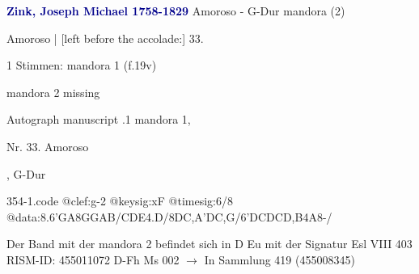 \documentclass[twocolumn]{book}
\begin{document}
\newline \par \vspace{7pt} \textcolor{darkblue}{\textbf{Zink, Joseph Michael  1758-1829}}
\newline Amoroso - G-Dur
\newline mandora (2)
\newline \begin{itshape}[f.19v, at left:] Amoroso | [left before the accolade:] 33.\end{itshape} 
\newline \textcolor{darkblue}{}  1 Stimmen: mandora 1  (f.19v)
\newline \begin{small} mandora 2 missing\end{small} 
\newline Autograph manuscript
.1  mandora 1, \begin{itshape}Nr. 33. Amoroso\end{itshape}, G-Dur  
\begin{filecontents*}{354-1.code}
@clef:g-2
@keysig:xF
@timesig:6/8
@data:{8.6'GA8G}{GAB}/{CDE}4.D/{8DC,A}{'DC,G}/{6'DCDCD,B}4A8-/
\end{filecontents*}
\newline
%
\newline Der Band mit der mandora 2 befindet sich in D Eu mit der Signatur Esl VIII 403
\newline RISM-ID: 455011072
\newline D-Fh  Ms 002
\newline $\rightarrow$ In Sammlung 419 (455008345)
      
\end{document}
